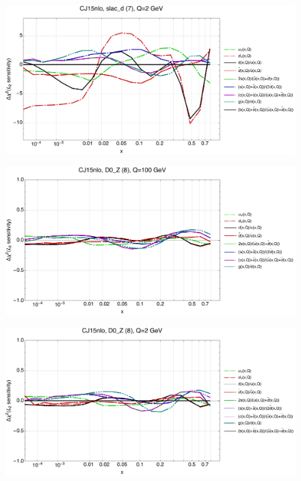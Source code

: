 \documentclass[10pt,aps,prd,floatfix,titlepage]{revtex4}
\begin{document}
\begin{figure}
\includegraphics[width=\textwidth,height=0.44\textheight,keepaspectratio]{2/7_CJ15nlo_q2_Sf_2.pdf}
\caption{}
\end{figure}
\clearpage
\begin{figure}
\includegraphics[width=\textwidth,height=0.44\textheight,keepaspectratio]{2/8_CJ15nlo_q100_Sf_2.pdf}
\caption{}
\end{figure}
\begin{figure}
\includegraphics[width=\textwidth,height=0.44\textheight,keepaspectratio]{2/8_CJ15nlo_q2_Sf_2.pdf}
\caption{}
\end{figure}
\end{document}
